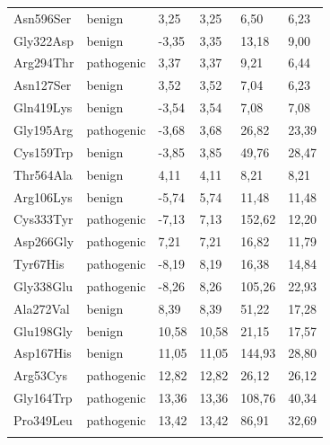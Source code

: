 \begin{table}[]
{\begin{tabular}{llllll}
        \rowcolor[HTML]{9AFF99} 
        Asn596Ser & benign & 3,25 & 3,25 & 6,50 & 6,23 \\
        \rowcolor[HTML]{9AFF99} 
        Gly322Asp & benign & -3,35 & 3,35 & 13,18 & 9,00 \\
        \rowcolor[HTML]{FFCCC9} 
        Arg294Thr & pathogenic & 3,37 & 3,37 & 9,21 & 6,44 \\
        \rowcolor[HTML]{9AFF99} 
        Asn127Ser & benign & 3,52 & 3,52 & 7,04 & 6,23 \\
        \rowcolor[HTML]{9AFF99} 
        Gln419Lys & benign & -3,54 & 3,54 & 7,08 & 7,08 \\
        \rowcolor[HTML]{FFCCC9} 
        Gly195Arg & pathogenic & -3,68 & 3,68 & 26,82 & 23,39 \\
        \rowcolor[HTML]{9AFF99} 
        Cys159Trp & benign & -3,85 & 3,85 & 49,76 & 28,47 \\
        \rowcolor[HTML]{9AFF99} 
        Thr564Ala & benign & 4,11 & 4,11 & 8,21 & 8,21 \\
        \rowcolor[HTML]{9AFF99} 
        Arg106Lys & benign & -5,74 & 5,74 & 11,48 & 11,48 \\
        \rowcolor[HTML]{FFCCC9} 
        Cys333Tyr & pathogenic & -7,13 & 7,13 & 152,62 & 12,20 \\
        \rowcolor[HTML]{FFCCC9} 
        Asp266Gly & pathogenic & 7,21 & 7,21 & 16,82 & 11,79 \\
        \rowcolor[HTML]{FFCCC9} 
        Tyr67His & pathogenic & -8,19 & 8,19 & 16,38 & 14,84 \\
        \rowcolor[HTML]{FFCCC9} 
        Gly338Glu & pathogenic & -8,26 & 8,26 & 105,26 & 22,93 \\
        \rowcolor[HTML]{EFEFEF} 
        Ala272Val & benign & 8,39 & 8,39 & 51,22 & 17,28 \\
        \rowcolor[HTML]{CBFFCB} 
        Glu198Gly & benign & 10,58 & 10,58 & 21,15 & 17,57 \\
        \rowcolor[HTML]{EFEFEF} 
        Asp167His & benign & 11,05 & 11,05 & 144,93 & 28,80 \\
        \rowcolor[HTML]{FFCCC9} 
        Arg53Cys & pathogenic & 12,82 & 12,82 & 26,12 & 26,12 \\
        \rowcolor[HTML]{FFCCC9} 
        Gly164Trp & pathogenic & 13,36 & 13,36 & 108,76 & 40,34 \\
        \rowcolor[HTML]{FFCCC9} 
        Pro349Leu & pathogenic & 13,42 & 13,42 & 86,91 & 32,69 \\
        \rowcolor[HTML]{FFCCC9} 

\end{tabular}}
\end{table}
